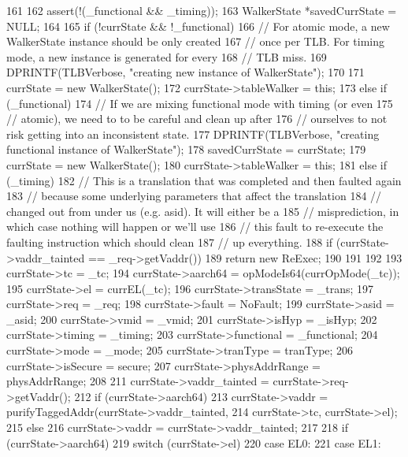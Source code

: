 \begin{DoxyCode}
161 {
162     assert(!(_functional && _timing));
163     WalkerState *savedCurrState = NULL;
164 
165     if (!currState && !_functional) {
166         // For atomic mode, a new WalkerState instance should be only created
167         // once per TLB. For timing mode, a new instance is generated for every
168         // TLB miss.
169         DPRINTF(TLBVerbose, "creating new instance of WalkerState\n");
170 
171         currState = new WalkerState();
172         currState->tableWalker = this;
173     } else if (_functional) {
174         // If we are mixing functional mode with timing (or even
175         // atomic), we need to to be careful and clean up after
176         // ourselves to not risk getting into an inconsistent state.
177         DPRINTF(TLBVerbose, "creating functional instance of WalkerState\n");
178         savedCurrState = currState;
179         currState = new WalkerState();
180         currState->tableWalker = this;
181     } else if (_timing) {
182         // This is a translation that was completed and then faulted again
183         // because some underlying parameters that affect the translation
184         // changed out from under us (e.g. asid). It will either be a
185         // misprediction, in which case nothing will happen or we'll use
186         // this fault to re-execute the faulting instruction which should clean
187         // up everything.
188         if (currState->vaddr_tainted == _req->getVaddr()) {
189             return new ReExec;
190         }
191     }
192 
193     currState->tc = _tc;
194     currState->aarch64 = opModeIs64(currOpMode(_tc));
195     currState->el = currEL(_tc);
196     currState->transState = _trans;
197     currState->req = _req;
198     currState->fault = NoFault;
199     currState->asid = _asid;
200     currState->vmid = _vmid;
201     currState->isHyp = _isHyp;
202     currState->timing = _timing;
203     currState->functional = _functional;
204     currState->mode = _mode;
205     currState->tranType = tranType;
206     currState->isSecure = secure;
207     currState->physAddrRange = physAddrRange;
208 
211     currState->vaddr_tainted = currState->req->getVaddr();
212     if (currState->aarch64)
213         currState->vaddr = purifyTaggedAddr(currState->vaddr_tainted,
214                                             currState->tc, currState->el);
215     else
216         currState->vaddr = currState->vaddr_tainted;
217 
218     if (currState->aarch64) {
219         switch (currState->el) {
220           case EL0:
221           case EL1:
}}}
\end{DoxyCode}
